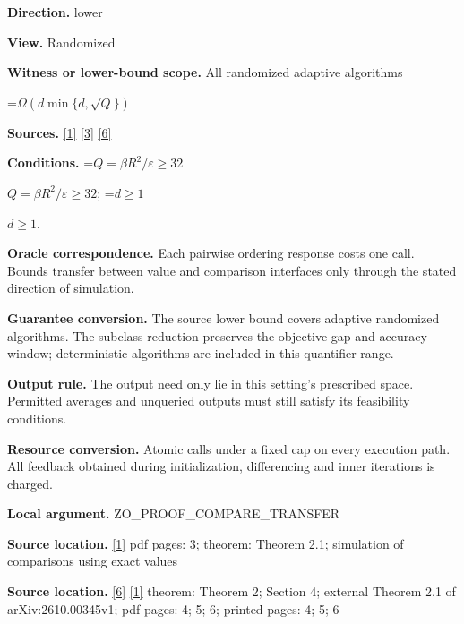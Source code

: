 \documentclass[10pt,a4paper]{article}
\newcommand{\AtlasMath}[1]{\par\begingroup\centering\setbox0=\hbox{$\displaystyle #1$}\ifdim\wd0>1.4\linewidth\typeout{ATLAS WIDE FORMULA: \the\wd0}\fi\ifdim\wd0>\linewidth\resizebox{\linewidth}{!}{\box0}\else\box0\fi\par\endgroup}
\newcommand{\AtlasInlineMath}[1]{\begingroup\setbox0=\hbox{$#1$}\ifdim\wd0>.4\linewidth\endgroup\AtlasMath{#1}\else\endgroup$#1$\fi}
\begin{document}
\textbf{Direction.} lower



\textbf{View.} Randomized



\textbf{Witness or lower-bound scope.} All randomized adaptive algorithms



\AtlasMath{\Omega(d\min\{d,\sqrt Q\})}


\textbf{Sources.} \href{https://arxiv.org/html/2610.00345v1}{[1]} \href{https://arxiv.org/html/2610.19652v1}{[3]} \href{https://github.com/WU-Wendao/Colombo/blob/main/colombo_sensorium/Complexity_altas/data/sources/colombo/COLOMBO_KIMI_002/kimi_002.pdf}{[6]}



\textbf{Conditions.} \AtlasInlineMath{Q=\beta R^2/\varepsilon \ge 32}; \AtlasInlineMath{d\ge 1}.



\textbf{Oracle correspondence.} Each pairwise ordering response costs one call. Bounds transfer between value and comparison interfaces only through the stated direction of simulation.



\textbf{Guarantee conversion.} The source lower bound covers adaptive randomized algorithms. The subclass reduction preserves the objective gap and accuracy window; deterministic algorithms are included in this quantifier range.



\textbf{Output rule.} The output need only lie in this setting's prescribed space. Permitted averages and unqueried outputs must still satisfy its feasibility conditions.



\textbf{Resource conversion.} Atomic calls under a fixed cap on every execution path. All feedback obtained during initialization, differencing and inner iterations is charged.



\textbf{Local argument.} ZO\_PROOF\_COMPARE\_TRANSFER



\textbf{Source location.} \href{https://arxiv.org/html/2610.00345v1}{[1]} pdf pages: 3; theorem: Theorem 2.1; simulation of comparisons using exact values



\textbf{Source location.} \href{https://github.com/WU-Wendao/Colombo/blob/main/colombo_sensorium/Complexity_altas/data/sources/colombo/COLOMBO_KIMI_002/kimi_002.pdf}{[6]} \href{https://arxiv.org/html/2610.00345v1}{[1]} theorem: Theorem 2; Section 4; external Theorem 2.1 of arXiv:2610.00345v1; pdf pages: 4; 5; 6; printed pages: 4; 5; 6
\end{document}
